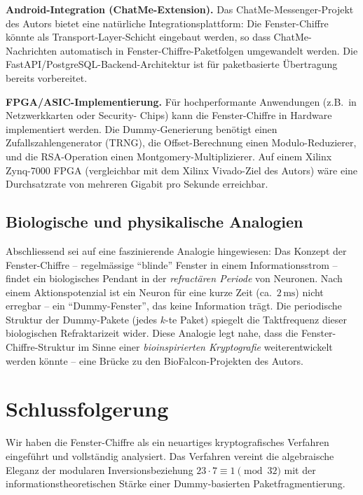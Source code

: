 ﻿\documentclass[12pt, a4paper]{article}
\theoremstyle{plain}
\theoremstyle{definition}
\theoremstyle{remark}
\begin{document}
\textbf{Android-Integration (ChatMe-Extension).}
Das ChatMe-Messenger-Projekt des Autors \cite{epp2026chatme} bietet eine
nat\"urliche Integrationsplattform: Die Fenster-Chiffre k\"onnte als
Transport-Layer-Schicht eingebaut werden, so dass ChatMe-Nachrichten
automatisch in Fenster-Chiffre-Paketfolgen umgewandelt werden.
Die FastAPI/PostgreSQL-Backend-Architektur ist f\"ur paketbasierte
\"Ubertragung bereits vorbereitet.

\textbf{FPGA/ASIC-Implementierung.}
F\"ur hochperformante Anwendungen (z.B.\ in Netzwerkkarten oder Security-
Chips) kann die Fenster-Chiffre in Hardware implementiert werden.
Die Dummy-Generierung ben\"otigt einen Zufallszahlengenerator (TRNG),
die Offset-Berechnung einen Modulo-Reduzierer, und die RSA-Operation
einen Montgomery-Multiplizierer. Auf einem Xilinx Zynq-7000 FPGA
(vergleichbar mit dem Xilinx Vivado-Ziel des Autors) w\"are eine
Durchsatzrate von mehreren Gigabit pro Sekunde erreichbar.

\subsection{Biologische und physikalische Analogien}

Abschliessend sei auf eine faszinierende Analogie hingewiesen: Das
Konzept der Fenster-Chiffre -- regelm\"assige ``blinde'' Fenster in
einem Informationsstrom -- findet ein biologisches Pendant in der
\emph{refract\"aren Periode} von Neuronen. Nach einem Aktionspotenzial
ist ein Neuron f\"ur eine kurze Zeit (ca.\ $2\,\text{ms}$) nicht erregbar --
ein ``Dummy-Fenster'', das keine Information tr\"agt. Die periodische
Struktur der Dummy-Pakete (jedes $k$-te Paket) spiegelt die Taktfrequenz
dieser biologischen Refraktarizeit wider. Diese Analogie legt nahe,
dass die Fenster-Chiffre-Struktur im Sinne einer \emph{bioinspirierten
Kryptografie} weiterentwickelt werden k\"onnte -- eine Br\"ucke zu den
BioFalcon-Projekten des Autors.

\section{Schlussfolgerung}
\label{sec:schluss}

Wir haben die Fenster-Chiffre als ein neuartiges kryptografisches Verfahren
eingef\"uhrt und vollst\"andig analysiert. Das Verfahren vereint die
algebraische Eleganz der modularen Inversionsbeziehung $23 \cdot 7 \equiv 1 \pmod{32}$
mit der informationstheoretischen St\"arke einer Dummy-basierten
Paketfragmentierung.
\end{document}
